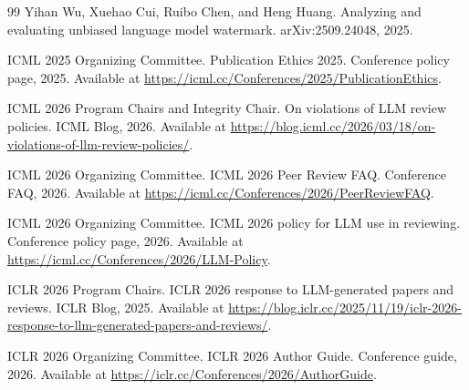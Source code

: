 \documentclass[11pt]{article}
\theoremstyle{definition}
\newcommand{\1}{\mathbf{1}}
\begin{document}
\begin{thebibliography}{99}
Yihan Wu, Xuehao Cui, Ruibo Chen, and Heng Huang.
\newblock Analyzing and evaluating unbiased language model watermark.
\newblock arXiv:2509.24048, 2025.

ICML 2025 Organizing Committee.
\newblock Publication Ethics 2025.
\newblock Conference policy page, 2025. Available at \url{https://icml.cc/Conferences/2025/PublicationEthics}.

ICML 2026 Program Chairs and Integrity Chair.
\newblock On violations of LLM review policies.
\newblock ICML Blog, 2026. Available at \url{https://blog.icml.cc/2026/03/18/on-violations-of-llm-review-policies/}.

ICML 2026 Organizing Committee.
\newblock ICML 2026 Peer Review FAQ.
\newblock Conference FAQ, 2026. Available at \url{https://icml.cc/Conferences/2026/PeerReviewFAQ}.

ICML 2026 Organizing Committee.
\newblock ICML 2026 policy for LLM use in reviewing.
\newblock Conference policy page, 2026. Available at \url{https://icml.cc/Conferences/2026/LLM-Policy}.

ICLR 2026 Program Chairs.
\newblock ICLR 2026 response to LLM-generated papers and reviews.
\newblock ICLR Blog, 2025. Available at \url{https://blog.iclr.cc/2025/11/19/iclr-2026-response-to-llm-generated-papers-and-reviews/}.

ICLR 2026 Organizing Committee.
\newblock ICLR 2026 Author Guide.
\newblock Conference guide, 2026. Available at \url{https://iclr.cc/Conferences/2026/AuthorGuide}.

\end{thebibliography}
\end{document}
